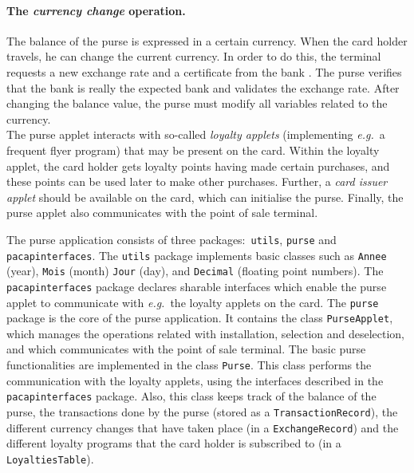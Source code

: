 \documentclass[a4paper]{llncs}
\begin{document}
\paragraph{\bf The \textit{currency change} operation.} The balance
of the purse is expressed in a certain currency. When the card holder
travels, he can change the current currency. In order to do this, the
terminal requests a new exchange rate and a certificate from the bank
. The purse verifies that the bank is really the expected bank and
validates the exchange rate. After changing the balance value, the
purse must modify all variables related to the currency. \\

The purse applet interacts with so-called \textit{loyalty applets}
(implementing \emph{e.g.}~a frequent flyer program) that may be
present on the card. Within the loyalty applet, the card holder gets
loyalty points having made certain purchases, and these points can be
used later to make other purchases. Further, a \textit{card issuer
applet} should be available on the card, which can initialise the
purse. Finally, the purse applet also communicates with the 
point of sale terminal. 

The purse application consists of three packages$:$ \texttt{utils},
\texttt{purse} and \texttt{pacap\-interfaces}. The {\tt utils} package
implements basic classes such as \texttt{Annee} (year), 
\texttt{Mois} (month) \texttt{Jour} (day), and \texttt{Decimal}
(floating point numbers).  The \texttt{pacap\-interfaces} package
declares sharable interfaces which enable the purse applet to
communicate with \emph{e.g.}~the loyalty applets on the card.  The
\texttt{purse} package is the core of the purse application.  It
contains the class
\texttt{PurseApplet}, which manages the operations related with 
installation, selection and deselection, and which communicates with the
point of sale terminal.  The basic purse functionalities are
implemented in the class
\texttt{Purse}. This class performs the communication
with the loyalty applets, using the interfaces described in the
\texttt{pacapinterfaces} package.  Also, this class keeps track of the 
balance of the purse, the transactions done by the purse (stored as a
\texttt{TransactionRecord}), the different currency changes that have
taken place (in a \texttt{ExchangeRecord}) and the different
loyalty programs that the card holder is subscribed to (in a
\texttt{LoyaltiesTable}). 
\end{document}
